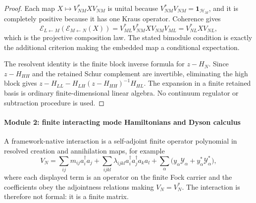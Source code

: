 \documentclass[12pt,a4paper]{article}
\begin{document}
\begin{proof}
Each map \(X\mapsto V_{NM}^*XV_{NM}\) is unital because
\(V_{NM}^*V_{NM}=\mathbf1_{\mathcal H_M}\), and it is completely positive
because it has one Kraus operator.  Coherence gives
\[
\mathcal E_{L\leftarrow M}(\mathcal E_{M\leftarrow N}(X))
=V_{ML}^*V_{NM}^*XV_{NM}V_{ML}
=V_{NL}^*XV_{NL},
\]
which is the projective composition law.  The stated bimodule condition is
exactly the additional criterion making the embedded map a conditional
expectation.

The resolvent identity is the finite block inverse formula for \(z-H_N\).
Since \(z-H_{HH}\) and the retained Schur complement are invertible,
eliminating the high block gives
\(z-H_{LL}-H_{LH}(z-H_{HH})^{-1}H_{HL}\).  The expansion in a finite
retained basis is ordinary finite-dimensional linear algebra.  No continuum
regulator or subtraction procedure is used.
\end{proof}

\paragraph{Module 2: finite interacting mode Hamiltonians and Dyson calculus}
\label{p4:sec:module-finite-interactions}

A framework-native interaction is a self-adjoint finite operator polynomial in resolved creation and annihilation maps, for example
\begin{equation}
\label{p4:eq:finite-interacting-mode-polynomial}
V_N
=
\sum_{ij}m_{ij}a_i^\dagger a_j
+\sum_{ijkl}\lambda_{ijkl}a_i^\dagger a_j^\dagger a_k a_l
+\sum_\alpha \bigl(y_\alpha\mathcal Y_\alpha+y_\alpha^*\mathcal Y_\alpha^*\bigr),
\end{equation}
where each displayed term is an operator on the finite Fock carrier and the coefficients obey the adjointness relations making \(V_N=V_N^*\).  The interaction is therefore not formal: it is a finite matrix.
\end{document}
